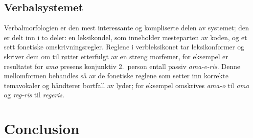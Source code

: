 \documentclass{article}
\begin{document}
\subsection{Verbalsystemet}
\label{conjugation}
Verbalmorfologien er den mest interessante og kompliserte delen av systemet;
den er delt inn i to deler: en leksikondel, som inneholder mesteparten av
koden, og et sett fonetiske omskrivningsregler. Reglene i verbleksikonet tar
leksikonformer og skriver dem om til r\o{}tter etterfulgt av en streng
morfemer, for eksempel er resultatet for \emph{amo} presens konjunktiv
2.~person entall passiv \emph{ama-e-ris}. Denne mellomformen behandles s\aa{}
av de fonetiske reglene som setter inn korrekte temavokaler og h\aa{}ndterer
bortfall av lyder; for eksempel omskrives \emph{ama-o} til \emph{amo} og
\emph{reg-ris} til \emph{regeris}.

\section{Conclusion} %

{}
\end{document}
